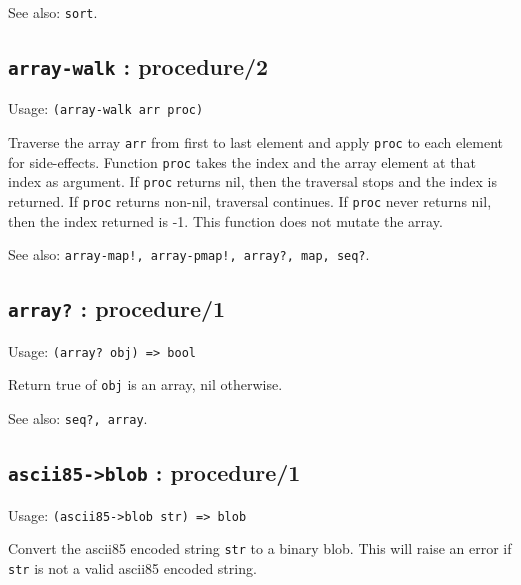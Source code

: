 \documentclass[
]{article}
\newcommand{\passthrough}[1]{#1}
\begin{document}
See also: \passthrough{\lstinline!sort!}.

\hypertarget{array-walk-procedure2-1}{%
\subsection{\texorpdfstring{\texttt{array-walk} :
procedure/2}{array-walk : procedure/2}}\label{array-walk-procedure2-1}}

Usage: \passthrough{\lstinline!(array-walk arr proc)!}

Traverse the array \passthrough{\lstinline!arr!} from first to last
element and apply \passthrough{\lstinline!proc!} to each element for
side-effects. Function \passthrough{\lstinline!proc!} takes the index
and the array element at that index as argument. If
\passthrough{\lstinline!proc!} returns nil, then the traversal stops and
the index is returned. If \passthrough{\lstinline!proc!} returns
non-nil, traversal continues. If \passthrough{\lstinline!proc!} never
returns nil, then the index returned is -1. This function does not
mutate the array.

See also:
\passthrough{\lstinline"array-map!, array-pmap!, array?, map, seq?"}.

\hypertarget{array-procedure1-1}{%
\subsection{\texorpdfstring{\texttt{array?} :
procedure/1}{array? : procedure/1}}\label{array-procedure1-1}}

Usage: \passthrough{\lstinline!(array? obj) => bool!}

Return true of \passthrough{\lstinline!obj!} is an array, nil otherwise.

See also: \passthrough{\lstinline!seq?, array!}.

\hypertarget{ascii85-blob-procedure1-1}{%
\subsection{\texorpdfstring{\texttt{ascii85-\textgreater{}blob} :
procedure/1}{ascii85-\textgreater blob : procedure/1}}\label{ascii85-blob-procedure1-1}}

Usage: \passthrough{\lstinline!(ascii85->blob str) => blob!}

Convert the ascii85 encoded string \passthrough{\lstinline!str!} to a
binary blob. This will raise an error if \passthrough{\lstinline!str!}
is not a valid ascii85 encoded string.
\end{document}
